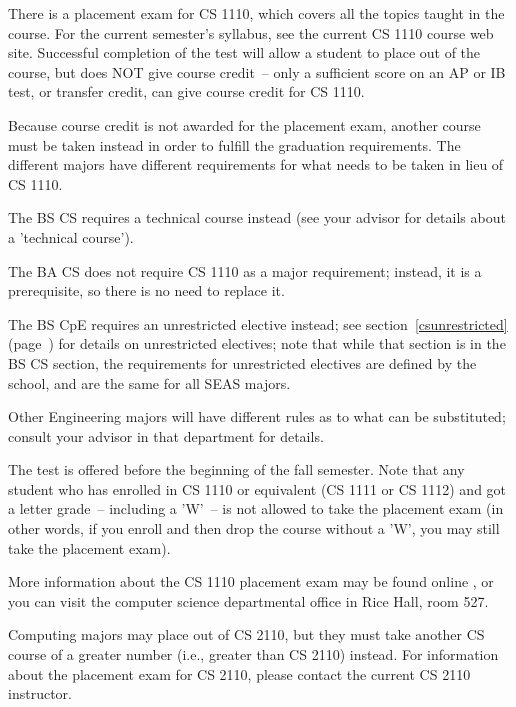 There is a placement exam for CS 1110, which covers all the topics
taught in the course. For the current semester's syllabus, see the
current CS 1110 course web site. Successful completion of the test
will allow a student to place out of the course, but does NOT give
course credit~-- only a sufficient score on an AP or IB test, or
transfer credit, can give course credit for CS 1110.

Because course credit is not awarded for the placement exam, another
course must be taken instead in order to fulfill the graduation
requirements.  The different majors have different requirements for
what needs to be taken in lieu of CS 1110.

\begin{itemlist}
\item The BS CS requires a technical course instead (see your advisor
for details about a 'technical course').
\item The BA CS does not require CS 1110 as a major requirement;
  instead, it is a prerequisite, so there is no need to replace it.
\item The BS CpE requires an unrestricted elective instead; see
section~\ref{csunrestricted} (page~\pageref{csunrestricted}) for
details on unrestricted electives; note that while that section is in
the BS CS section, the requirements for unrestricted electives are
defined by the school, and are the same for all SEAS majors.
\item Other Engineering majors will have different rules as to what
  can be substituted; consult your advisor in that department for
  details.
\end{itemlist}

The test is offered before the beginning of the fall semester. Note
that any student who has enrolled in CS 1110 or equivalent (CS 1111 or
CS 1112) and got a letter grade~-- including a 'W'~-- is not allowed
to take the placement exam (in other words, if you enroll and then
drop the course without a 'W', you may still take the placement
exam).

More information about the CS 1110 placement exam may be found online
, or you can
visit the computer science departmental office in Rice Hall, room 527.

Computing majors may place out of CS 2110, but they must take another
CS course of a greater number (i.e., greater than CS 2110) instead.
For information about the placement exam for CS 2110, please contact
the current CS 2110 instructor.

